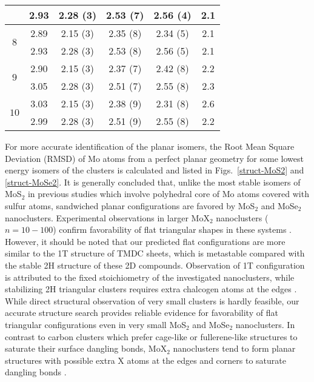 \documentclass[nofootinbib,10pt,aip,twocolumn,showpacs]{revtex4-1}
\begin{document}
\begin{table}[!htb]
\begin{ruledtabular}
\begin{tabular}{cccccc}
 &    2.93   &   2.28 (3)  &   2.53 (7)  &   2.56 (4)  &  2.1  \\ \hline
\multirow{2}{*}{$8$} 
 &   2.89    &   2.15 (3)  &   2.35 (8)  &  2.34 (5)   &  2.1  \\
 &   2.93    &   2.28 (3)  &   2.53 (8)  &  2.56 (5)   &  2.1  \\ \hline
\multirow{2}{*}{$9$} 
 &   2.90    &   2.15 (3)  &   2.37 (7)  &  2.42 (8)   &  2.2  \\
 &   3.05    &   2.28 (3)  &   2.51 (7)  &  2.55 (8)   &  2.3  \\ \hline
\multirow{2}{*}{$10$} 
 &   3.03    &   2.15 (3)  &   2.38 (9)  &  2.31 (8)   &  2.6  \\
 &   2.99    &   2.28 (3)  &   2.51 (9)  &  2.55 (8)   &  2.2  \\
\end{tabular}
\end{ruledtabular}
\end{table}


For more accurate identification of the planar isomers, 
the Root Mean Square Deviation (RMSD) of Mo atoms from a perfect planar geometry
for some lowest energy isomers of the clusters is calculated 
and listed in Figs.~\ref{struct-MoS2} and \ref{struct-MoSe2}.
It is generally concluded that, unlike the most stable isomers 
of MoS$_2$ in previous studies\cite{murugan2005a,murugan2007u} which 
involve polyhedral core of Mo atoms covered with sulfur atoms,
sandwiched planar configurations are favored by MoS$_2$ and MoSe$_2$ nanoclusters. 
Experimental observations in larger MoX$_2$ nanoclusters ($n=10-100$) 
confirm favorability of flat triangular shapes in these systems \cite{bertram2006}.
However, it should be noted that our predicted flat configurations are more
similar to the 1T structure of TMDC sheets, which is metastable compared with 
the stable 2H structure of these 2D compounds.
Observation of 1T configuration is attributed to the fixed stoichiometry of
the investigated nanoclusters,
while stabilizing 2H triangular clusters requires extra chalcogen atoms 
at the edges \cite{lauritsen2007size}. 
While direct structural observation of very small clusters is hardly feasible,
our accurate structure search provides reliable evidence for favorability of 
flat triangular configurations even in very small MoS$_2$ and MoSe$_2$ nanoclusters.
In contrast to carbon clusters which prefer cage-like or fullerene-like 
structures to saturate their surface dangling bonds,
MoX$_2$ nanoclusters tend to form planar structures 
with possible extra X atoms at the edges and corners 
to saturate dangling bonds \cite{bertram2006}.
\end{document}
